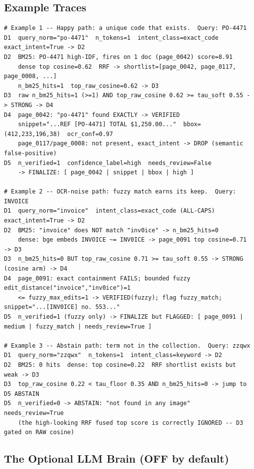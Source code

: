 \documentclass[12pt,a4paper]{article}
\begin{document}
\subsection{Example Traces}

\begin{lstlisting}[basicstyle=\ttfamily\footnotesize]
# Example 1 -- Happy path: a unique code that exists.  Query: PO-4471
D1  query_norm="po-4471"  n_tokens=1  intent_class=exact_code  exact_intent=True -> D2
D2  BM25: PO-4471 high-IDF, fires on 1 doc (page_0042) score=8.91
    dense top cosine=0.62  RRF -> shortlist=[page_0042, page_0117, page_0008, ...]
    n_bm25_hits=1  top_raw_cosine=0.62 -> D3
D3  raw n_bm25_hits=1 (>=1) AND top_raw_cosine 0.62 >= tau_soft 0.55 -> STRONG -> D4
D4  page_0042: "po-4471" found EXACTLY -> VERIFIED
    snippet="...REF [PO-4471] TOTAL $1,250.00..."  bbox=(412,233,196,38)  ocr_conf=0.97
    page_0117/page_0008: not present, exact_intent -> DROP (semantic false-positive)
D5  n_verified=1  confidence_label=high  needs_review=False
    -> FINALIZE: [ page_0042 | snippet | bbox | high ]

# Example 2 -- OCR-noise path: fuzzy match earns its keep.  Query: INVOICE
D1  query_norm="invoice"  intent_class=exact_code (ALL-CAPS)  exact_intent=True -> D2
D2  BM25: "invoice" does NOT match "inv0ice" -> n_bm25_hits=0
    dense: bge embeds INVOICE ~= INV0ICE -> page_0091 top cosine=0.71 -> D3
D3  n_bm25_hits=0 BUT top_raw_cosine 0.71 >= tau_soft 0.55 -> STRONG (cosine arm) -> D4
D4  page_0091: exact containment FAILS; bounded fuzzy edit_distance("invoice","inv0ice")=1
    <= fuzzy_max_edits=1 -> VERIFIED(fuzzy); flag fuzzy_match; snippet="...[INV0ICE] no. 553..."
D5  n_verified=1 (fuzzy only) -> FINALIZE but FLAGGED: [ page_0091 | medium | fuzzy_match | needs_review=True ]

# Example 3 -- Abstain path: term not in the collection.  Query: zzqwx
D1  query_norm="zzqwx"  n_tokens=1  intent_class=keyword -> D2
D2  BM25: 0 hits  dense: top cosine=0.22  RRF shortlist exists but weak -> D3
D3  top_raw_cosine 0.22 < tau_floor 0.35 AND n_bm25_hits=0 -> jump to D5 ABSTAIN
D5  n_verified=0 -> ABSTAIN: "not found in any image"  needs_review=True
    (the high-looking RRF fused top score is correctly IGNORED -- D3 gated on RAW cosine)
\end{lstlisting}

\subsection{The Optional LLM Brain (OFF by default)}
\end{document}
